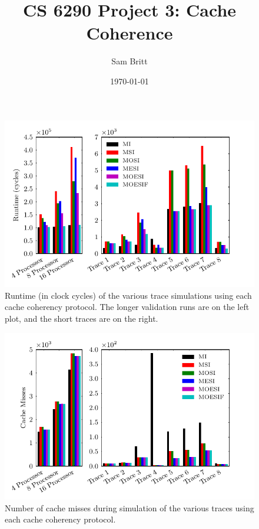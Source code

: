 \documentclass{article}
\title{CS 6290 Project 3: Cache Coherence}
\author{Sam Britt}
\date{\today}
\newcommand\figsize{.9\linewidth}
\begin{document}
  \maketitle

  \begin{figure}[htbp]
    \label{fig:runtime}
    \centering
    \begin{minipage}[t]{\figsize}
      \centering
      \includegraphics[width=\linewidth]{../runs/plots/runtime}
      \caption{Runtime (in clock cycles) of the various trace
        simulations using each cache coherency protocol. The longer
        validation runs are on the left plot, and the short traces are
        on the right.}
    \end{minipage}
  \end{figure}

  \begin{figure}[htbp]
    \label{fig:misses}
    \centering
    \begin{minipage}[t]{\figsize}
      \centering
      \includegraphics[width=\linewidth]{../runs/plots/misses}
      \caption{Number of cache misses during simulation of the various
        traces using each cache coherency protocol.}
    \end{minipage}
  \end{figure}
\end{document}
